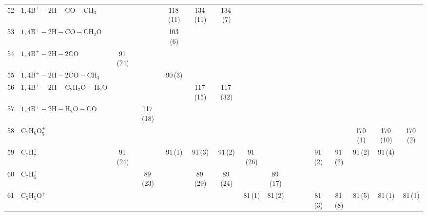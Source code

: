 \documentclass[]{article}
\begin{document}
\begin{table}
{\begin{tabular}{ll|ccccc|ccccc|ccccc}
  52 & $\mathrm{1{,}4B^+{-}2H{-}CO{-}CH_{3}}$ &  &  & 118\,(11) & 134\,(11) & 134\,(7) &  &  &  &  &  &  &  &  &  &  \\ 
  53 & $\mathrm{1{,}4B^+{-}2H{-}CO{-}CH_{2}O}$ &  &  & 103\,(6) &  &  &  &  &  &  &  &  &  &  &  &  \\ 
  54 & $\mathrm{1{,}4B^+{-}2H{-}2CO}$ & 91\,(24) &  &  &  &  &  &  &  &  &  &  &  &  &  &  \\ 
  55 & $\mathrm{1{,}4B^+{-}2H{-}2CO{-}CH_{3}}$ &  &  & 90\,(3) &  &  &  &  &  &  &  &  &  &  &  &  \\ 
  56 & $\mathrm{1{,}4B^+{-}2H{-}C_{2}H_{2}O{-}H_{2}O}$ &  &  &  & 117\,(15) & 117\,(32) &  &  &  &  &  &  &  &  &  &  \\ 
  57 & $\mathrm{1{,}4B^+{-}2H{-}H_{2}O{-}CO}$ &  & 117\,(18) &  &  &  &  &  &  &  &  &  &  &  &  &  \\ 
  58 & $\mathrm{C_{7}H_{6}O_{5}^+}$ &  &  &  &  &  &  &  &  &  &  &  &  & 170\,(1) & 170\,(10) & 170\,(2) \\ 
  59 & $\mathrm{C_{7}H_{7}^+}$ & 91\,(24) &  & 91\,(1) & 91\,(3) & 91\,(2) & 91\,(26) &  &  &  &  & 91\,(2) & 91\,(2) & 91\,(2) & 91\,(4) &  \\ 
  60 & $\mathrm{C_{7}H_{5}^+}$ &  & 89\,(23) &  & 89\,(29) & 89\,(24) &  & 89\,(17) &  &  &  &  &  &  &  &  \\ 
  61 & $\mathrm{C_{5}H_{5}O^+}$ &  &  &  &  &  & 81\,(1) & 81\,(2) &  &  &  & 81\,(3) & 81\,(8) & 81\,(5) & 81\,(1) & 81\,(1) \\ 
   \bottomrule
\end{tabular}
}
\end{table}

\qquad
\end{document}
